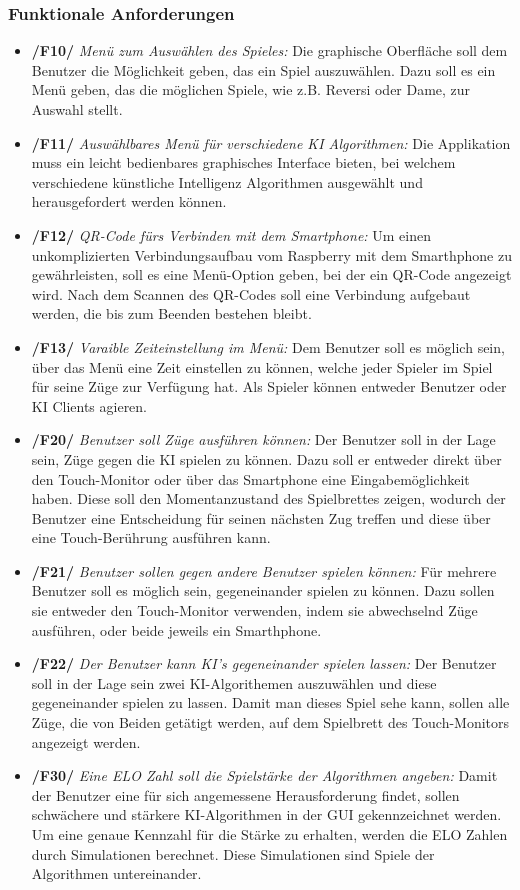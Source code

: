 \documentclass[12pt,a4paper,bibliography=totocnumbered,listof=totocnumbered]{article}
\begin{document}
\begin{appendix}
\subsubsection{Funktionale Anforderungen}
\begin{itemize}
    \item \textbf{/F10/} \textit{Menü zum Auswählen des Spieles:} Die graphische Oberfläche soll dem Benutzer die Möglichkeit geben, das ein Spiel auszuwählen.
        Dazu soll es ein Menü geben, das die möglichen Spiele, wie z.B. Reversi oder Dame, zur Auswahl stellt.
    \item \textbf{/F11/} \textit{Auswählbares Menü für verschiedene KI Algorithmen:} Die Applikation muss ein leicht bedienbares graphisches Interface bieten,
        bei welchem verschiedene künstliche Intelligenz Algorithmen ausgewählt und herausgefordert werden können.
    \item \textbf{/F12/} \textit{QR-Code fürs Verbinden mit dem Smartphone:} Um einen unkomplizierten Verbindungsaufbau vom Raspberry mit dem Smarthphone zu 
        gewährleisten, soll es eine Menü-Option geben, bei der ein QR-Code angezeigt wird. Nach dem Scannen des QR-Codes soll eine Verbindung
        aufgebaut werden, die bis zum Beenden bestehen bleibt.
    \item \textbf{/F13/} \textit{Varaible Zeiteinstellung im Menü:} Dem Benutzer soll es möglich sein, über das Menü eine Zeit einstellen zu können, 
        welche jeder Spieler im Spiel für seine Züge zur Verfügung hat. Als Spieler können entweder Benutzer oder KI Clients agieren.
    \item \textbf{/F20/} \textit{Benutzer soll Züge ausführen können:} Der Benutzer soll in der Lage sein, Züge gegen die KI spielen zu können. Dazu soll er entweder
        direkt über den Touch-Monitor oder über das Smartphone eine Eingabemöglichkeit haben. Diese soll den Momentanzustand des Spielbrettes zeigen,
        wodurch der Benutzer eine Entscheidung für seinen nächsten Zug treffen und diese über eine Touch-Berührung ausführen kann.
    \item \textbf{/F21/} \textit{Benutzer sollen gegen andere Benutzer spielen können:} Für mehrere Benutzer soll es möglich sein, gegeneinander spielen zu können. Dazu sollen sie 
        entweder den Touch-Monitor verwenden, indem sie abwechselnd Züge ausführen, oder beide jeweils ein Smarthphone.
    \item \textbf{/F22/} \textit{Der Benutzer kann KI's gegeneinander spielen lassen:} Der Benutzer soll in der Lage sein zwei KI-Algorithemen auszuwählen
        und diese gegeneinander spielen zu lassen. Damit man dieses Spiel sehe kann, sollen alle Züge, die 
        von Beiden getätigt werden, auf dem Spielbrett des Touch-Monitors angezeigt werden.
    \item \textbf{/F30/} \textit{Eine ELO Zahl soll die Spielstärke der Algorithmen angeben:} Damit der Benutzer eine für sich angemessene Herausforderung findet,
        sollen schwächere und stärkere KI-Algorithmen in der GUI gekennzeichnet werden. Um eine genaue Kennzahl für die Stärke zu erhalten, werden die ELO Zahlen durch
        Simulationen berechnet. Diese Simulationen sind Spiele der Algorithmen untereinander.
   

\end{itemize}
\end{appendix}
\end{document}
